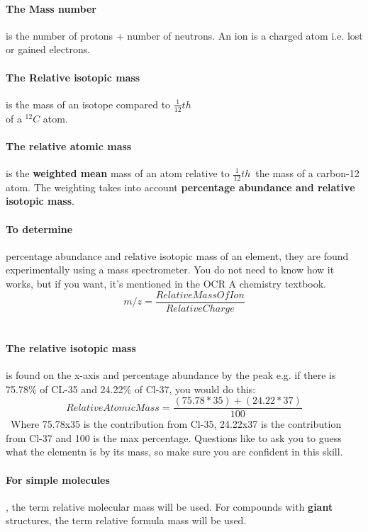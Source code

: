 \paragraph{The Mass number} is the number of protons + number of neutrons. 
An ion is a charged atom i.e. lost or gained electrons.
\paragraph{The Relative isotopic mass}is the mass of an isotope compared to \(\frac{1}{12}th\)\\ of a $^{12}C$ atom. 
\paragraph{The relative atomic mass}is the \textbf{weighted mean} mass of an atom relative to  \(\frac{1}{12}th\)\ the mass of a carbon-12 atom. The weighting takes into account \textbf{percentage abundance and relative isotopic mass}. 

\paragraph{To determine} percentage abundance and relative isotopic mass of an element, they are found experimentally using a mass spectrometer. You do not need to know how it works, but if you want, it's mentioned in the OCR A chemistry textbook.
\[m/z= \frac{Relative Mass Of Ion}{Relative Charge}\]\
\paragraph{The relative isotopic mass} is found on the x-axis and percentage abundance by the peak e.g. if there is 75.78\% of CL-35 and 24.22\% of Cl-37, you would do this:
\[Relative Atomic Mass=\frac{(75.78*35)+(24.22*37)}{100}\]\
Where 75.78x35 is the contribution from Cl-35, 24.22x37 is the contribution from Cl-37 and 100 is the max percentage. Questions like to ask you to guess what the elementn is by its mass, so make sure you are confident in this skill. 
\paragraph{For simple molecules}, the term relative molecular mass will be used.
For compounds with \textbf{giant} structures, the term relative formula mass will be used.
